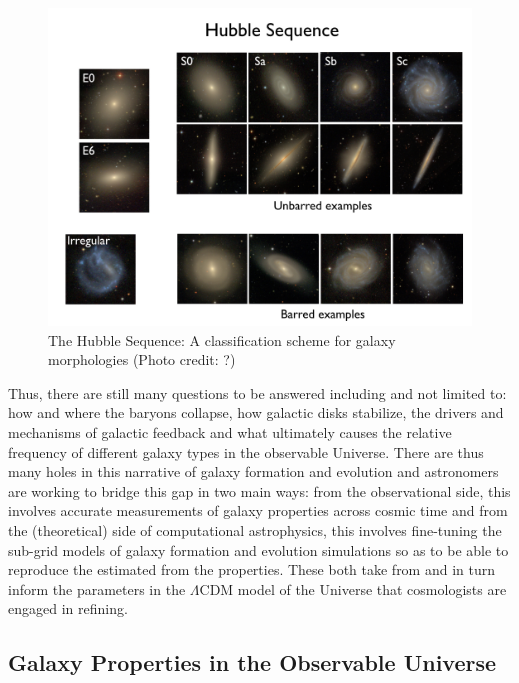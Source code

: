 \begin{figure}
\includegraphics[width=\textwidth]{figures/hubble.jpeg}
\caption[ The Hubble Sequence: A classification scheme for galaxy morphologies (Photo credit: ?)]
{The Hubble Sequence: A classification scheme for galaxy morphologies (Photo credit: ?)
\label{fig:hubble_classification}}
\end{figure}

Thus, there are still many questions to be answered including and not limited to: how and where the baryons collapse, how galactic disks stabilize, the drivers and mechanisms of galactic feedback and what ultimately causes the relative frequency of different galaxy types in the observable Universe. There are thus many holes in this narrative of galaxy formation and evolution and astronomers are working to bridge this gap in two main ways: from the observational side, this involves accurate measurements of galaxy properties across cosmic time and from the (theoretical) side of computational astrophysics, this involves fine-tuning the sub-grid models of galaxy formation and evolution simulations so as to be able to reproduce the estimated from the properties. These both take from and in turn inform the parameters in the $\Lambda$CDM model of the Universe that cosmologists are engaged in refining.\\

\subsection{Galaxy Properties in the Observable Universe}

